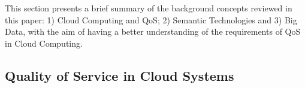 This section presents a brief summary of the background concepts reviewed in this paper: 1) Cloud Computing and QoS; 2) Semantic Technologies 
and 3) Big Data, with the aim of having a better understanding of the requirements of QoS in Cloud Computing.


\subsection{Quality of Service in Cloud Systems}

